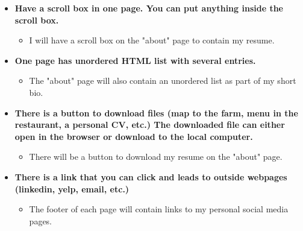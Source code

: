 \documentclass{article}
\begin{document}
\begin{itemize}[leftmargin=1cm]
	\item \textbf{Have a scroll box in one page. You can put anything inside the scroll box.}
    \begin{itemize}
        \item I will have a scroll box on the "about" page to contain my resume. 
    \end{itemize}

	\item \textbf{One page has unordered HTML list with several entries.}
    \begin{itemize}
        \item The "about" page will also contain an unordered list as part of my short bio.
    \end{itemize}

	\item \textbf{There is a button to download files (map to the farm, menu in the restaurant, a personal CV, etc.) The downloaded file can either open in the browser or download to the local computer.}
    \begin{itemize}
        \item There will be a button to download my resume on the "about" page. 
    \end{itemize}

	\item \textbf{There is a link that you can click and leads to outside webpages (linkedin, yelp, email, etc.)}
    \begin{itemize}
        \item The footer of each page will contain links to my personal social media pages. 
    \end{itemize}

\end{itemize}
\end{document}
